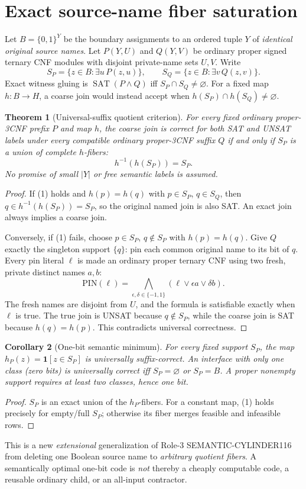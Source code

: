 \documentclass[11pt]{article}
\newtheorem{theorem}{Theorem}
\newtheorem{corollary}[theorem]{Corollary}
\newcommand{\SAT}{\operatorname{SAT}}
\begin{document}
\section{Exact source-name fiber saturation}
Let $B=\{0,1\}^{Y}$ be the boundary assignments to an ordered
tuple $Y$ of \emph{identical original source names}. Let $P(Y,U)$
and $Q(Y,V)$ be ordinary proper signed ternary CNF modules
with disjoint private-name sets $U,V$.
Write
\[
S_P=\{z\in B:\exists u\,P(z,u)\},\qquad
S_Q=\{z\in B:\exists v\,Q(z,v)\}.
\]
Exact witness gluing is $\SAT(P\wedge Q)$ iff
$S_P\cap S_Q\ne\varnothing$. For a fixed map $h:B\to H$,
a coarse join would instead accept when
$h(S_P)\cap h(S_Q)\ne\varnothing$.

\begin{theorem}[Universal-suffix quotient criterion]\label{th:fiber}
For every fixed ordinary proper-3CNF prefix $P$ and map $h$,
the coarse join is correct for \emph{both SAT and UNSAT labels
under every compatible ordinary proper-3CNF suffix $Q$}
if and only if $S_P$ is a union of complete $h$-fibers:
\[
                  h^{-1}(h(S_P))=S_P.                 \tag{1}
\]
No promise of small $|Y|$ or free semantic labels is assumed.
\end{theorem}
\begin{proof}
If (1) holds and $h(p)=h(q)$ with $p\in S_P$, $q\in S_Q$,
then $q\in h^{-1}(h(S_P))=S_P$, so the original named join
is also SAT. An exact join always implies a coarse join.

Conversely, if (1) fails, choose $p\in S_P$, $q\notin S_P$
with $h(p)=h(q)$. Give $Q$ exactly the singleton support $\{q\}$:
pin each common original name to its bit of $q$. Every pin literal
$\ell$ is made an ordinary proper ternary CNF using two fresh,
private distinct names $a,b$:
\[
\mathrm{PIN}(\ell)=
\bigwedge_{\epsilon,\delta\in\{-1,1\}}
 (\ell\vee\epsilon a\vee\delta b).                   \tag{2}
\]
The fresh names are disjoint from $U$, and the formula is satisfiable
exactly when $\ell$ is true. The true join is UNSAT because
$q\notin S_P$, while the coarse join is SAT because $h(q)=h(p)$.
This contradicts universal correctness.
\end{proof}

\begin{corollary}[One-bit semantic minimum]\label{cor:one}
For every fixed support $S_P$, the map
$h_P(z)=\mathbf 1[z\in S_P]$ is universally suffix-correct.
An interface with only one class (zero bits) is universally correct
iff $S_P=\varnothing$ or $S_P=B$. A proper nonempty support
requires at least two classes, hence one bit.
\end{corollary}
\begin{proof}
$S_P$ is an exact union of the $h_P$-fibers.
For a constant map, (1) holds precisely for empty/full $S_P$;
otherwise its fiber merges feasible and infeasible rows.
\end{proof}
This is a new \emph{extensional} generalization of
Role-3 SEMANTIC-CYLINDER116 from deleting one Boolean source name
to \emph{arbitrary quotient fibers}. A semantically optimal
one-bit code is \emph{not} thereby a cheaply computable code,
a reusable ordinary child, or an all-input contractor.
\end{document}
